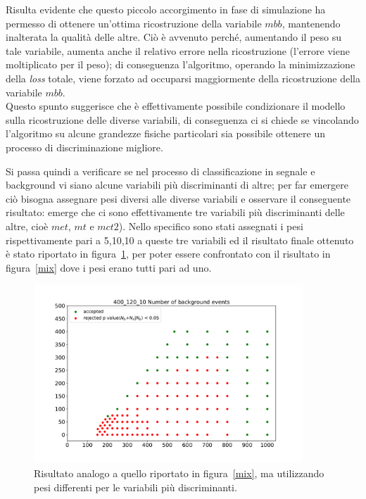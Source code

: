 Risulta evidente che questo piccolo accorgimento in fase di simulazione ha permesso di ottenere un'ottima ricostruzione della variabile $\textit{mbb}$, mantenendo inalterata la qualità delle altre. Ciò è avvenuto perché, aumentando il peso su tale variabile, aumenta anche il relativo errore nella ricostruzione (l'errore viene moltiplicato per il peso); di conseguenza l'algoritmo, operando la minimizzazione della \textit{loss} totale, viene forzato ad occuparsi maggiormente della ricostruzione della variabile $\textit{mbb}$. \\
Questo spunto suggerisce che è effettivamente possibile condizionare il modello sulla ricostruzione delle diverse variabili, di conseguenza ci si chiede se vincolando l'algoritmo su alcune grandezze fisiche particolari sia possibile ottenere un processo di discriminazione migliore.

\newpage

Si passa quindi a verificare se nel processo di classificazione in segnale e background vi siano alcune variabili più discriminanti di altre; per far emergere ciò bisogna assegnare pesi diversi alle diverse variabili e osservare il conseguente risultato: emerge che ci sono effettivamente tre variabili più discriminanti delle altre, cioè $\textit{met}$, $\textit{mt}$ e $\textit{mct2}$). Nello specifico sono stati assegnati i pesi rispettivamente pari a 5,10,10 a queste tre variabili ed il risultato finale ottenuto è stato riportato in figura~\ref{mix_ottimizzato}, per poter essere confrontato con il risultato in figura~\ref{mix} dove i pesi erano tutti pari ad uno.

\begin{figure}[h!]
	\centering
	\includegraphics[width=0.90\textwidth]{figs/risultati_simulazione/mix_ottimizzato.pdf}
	\caption{Risultato analogo a quello riportato in figura~\ref{mix}, ma utilizzando pesi differenti per le variabili più discriminanti.}
	\label{mix_ottimizzato}
\end{figure}

